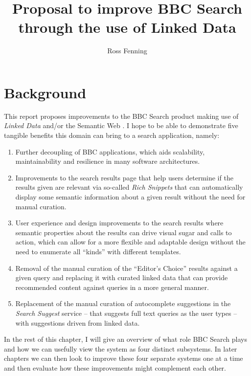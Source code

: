 \documentclass[10pt,a4paper]{report}
\title{Proposal to improve BBC Search through the use of Linked Data}
\author{Ross Fenning}
\begin{document}
\maketitle

\chapter{Background}

This report proposes improvements to the BBC Search product making use
of \emph{Linked Data} \cite{bizer2009linked} and/or the Semantic Web
\cite{berners2001semantic}. I hope to be able to demonstrate five tangible
benefits this domain can bring to a search application, namely:

\begin{enumerate}
  \item Further decoupling of BBC applications, which aids scalability,
    maintainability and resilience in many software architectures. \cite{}
  \item Improvements to the search results page that help users determine
    if the results given are relevant via so-called \emph{Rich Snippets}
    that can automatically display some semantic information about a given
    result without the need for manual curation.
  \item User experience and design improvements to the search results
    where semantic properties about the results can drive visual sugar
    and calls to action, which can allow for a more flexible and
    adaptable design without the need to enumerate all ``kinds'' with
    different templates.
  \item Removal of the manual curation of the ``Editor's Choice'' results
    against a given query and replacing it with curated linked data that
    can provide recommended content against queries in a more general
    manner.
  \item Replacement of the manual curation of autocomplete suggestions
    in the \emph{Search Suggest} service -- that suggests full text queries
    as the user types -- with suggestions driven from linked data.
\end{enumerate}

In the rest of this chapter, I will give an overview of what role BBC
Search plays and how we can usefully view the system as four
distinct subsystems. In later chapters we can then look to improve these
four separate systems one at a time and then evaluate how these improvements
might complement each other.
\end{document}
